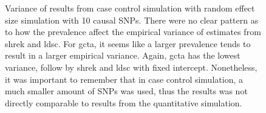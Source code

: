 \begin{figure}
{					
					\label{fig:ldscInCC10RandVar}
				}
				\caption[Variance of Case Control Simulation Results (10 Causal)]
				{Variance of results from case control simulation with random effect size simulation with 10 causal \glspl{SNP}.
					There were no clear pattern as to how the prevalence affect the empirical variance of estimates from \gls{shrek} and \gls{ldsc}. 
					For \gls{gcta}, it seems like a larger prevalence tends to result in a larger empirical variance. 
					Again, \gls{gcta} has the lowest variance, follow by \gls{shrek} and \gls{ldsc} with fixed intercept.
					Nonetheless, it was important to remember that in case control simulation, a much smaller amount of \glspl{SNP} was used, thus the results was not directly comparable to results from the quantitative simulation.
				} 
				\label{fig:CC10RandVar}
			\end{figure}
